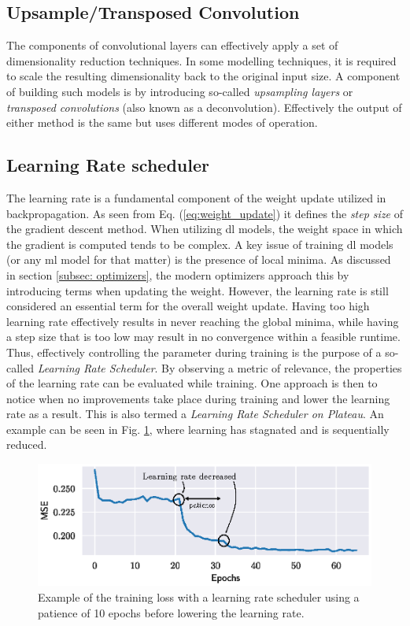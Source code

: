 \subsection{Upsample/Transposed Convolution}
The components of convolutional layers can effectively apply a set of dimensionality reduction techniques. In some modelling techniques, it is required to scale the resulting dimensionality back to the original input size. A component of building such models is by introducing so-called \emph{upsampling layers} or \emph{transposed convolutions} (also known as a deconvolution). Effectively the output of either method is the same but uses different modes of operation. 


\subsection{Learning Rate scheduler}\label{subsec:lr_scheduler}
The learning rate is a fundamental component of the weight update utilized in backpropagation. As seen from Eq. (\ref{eq:weight_update}) it defines the \emph{step size} of the gradient descent method. When utilizing \gls{dl} models, the weight space in which the gradient is computed tends to be complex. A key issue of training \gls{dl} models (or any \gls{ml} model for that matter) is the presence of local minima. As discussed in section \ref{subsec: optimizers}, the modern optimizers approach this by introducing terms when updating the weight. However, the learning rate is still considered an essential term for the overall weight update. Having too high learning rate effectively results in never reaching the global minima, while having a step size that is too low may result in no convergence within a feasible runtime. Thus, effectively controlling the parameter during training is the purpose of a so-called \emph{Learning Rate Scheduler}. By observing a metric of relevance, the properties of the learning rate can be evaluated while training. One approach is then to notice when no improvements take place during training and lower the learning rate as a result. This is also termed a \emph{Learning Rate Scheduler on Plateau}. An example can be seen in Fig. \ref{fig:learning_rate}, where learning has stagnated and is sequentially reduced.

\begin{figure}
    \includegraphics[]{chapters/figures/learningrate_scheduler_example.eps}
    \caption{Example of the training loss with a learning rate scheduler using a patience of 10 epochs before lowering the learning rate. }\label{fig:learning_rate}
\end{figure}


